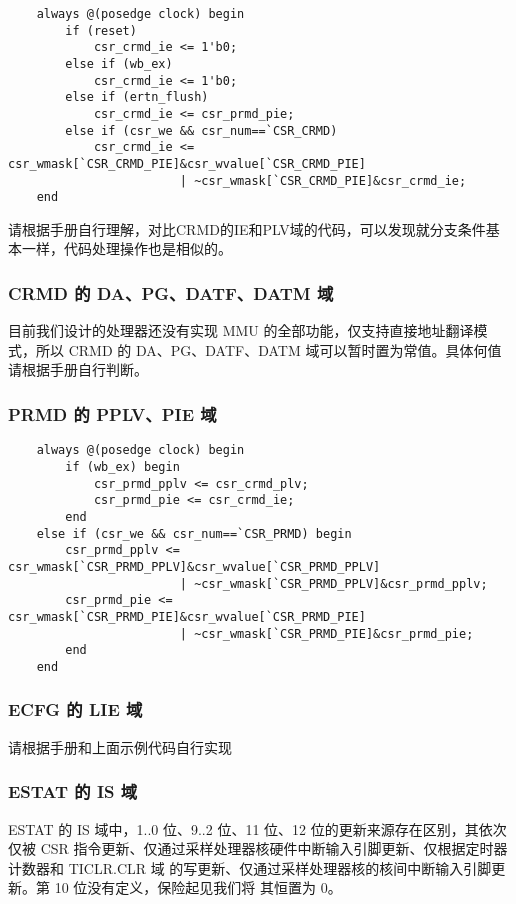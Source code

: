 \begin{lstlisting}
    always @(posedge clock) begin
        if (reset)
            csr_crmd_ie <= 1'b0;
        else if (wb_ex)
            csr_crmd_ie <= 1'b0;
        else if (ertn_flush)
            csr_crmd_ie <= csr_prmd_pie;
        else if (csr_we && csr_num==`CSR_CRMD)
            csr_crmd_ie <= csr_wmask[`CSR_CRMD_PIE]&csr_wvalue[`CSR_CRMD_PIE]
                        | ~csr_wmask[`CSR_CRMD_PIE]&csr_crmd_ie;
    end
\end{lstlisting}

请根据手册自行理解，对比CRMD的IE和PLV域的代码，可以发现就分支条件基本一样，代码处理操作也是相似的。

\subsubsection{CRMD 的 DA、PG、DATF、DATM 域}

目前我们设计的处理器还没有实现 MMU 的全部功能，仅支持直接地址翻译模式，所以
CRMD 的 DA、PG、DATF、DATM 域可以暂时置为常值。具体何值请根据手册自行判断。

\subsubsection{PRMD 的 PPLV、PIE 域}

\begin{lstlisting}
    always @(posedge clock) begin
        if (wb_ex) begin
            csr_prmd_pplv <= csr_crmd_plv;
            csr_prmd_pie <= csr_crmd_ie;
        end
    else if (csr_we && csr_num==`CSR_PRMD) begin
        csr_prmd_pplv <= csr_wmask[`CSR_PRMD_PPLV]&csr_wvalue[`CSR_PRMD_PPLV]
                        | ~csr_wmask[`CSR_PRMD_PPLV]&csr_prmd_pplv;
        csr_prmd_pie <= csr_wmask[`CSR_PRMD_PIE]&csr_wvalue[`CSR_PRMD_PIE]
                        | ~csr_wmask[`CSR_PRMD_PIE]&csr_prmd_pie;
        end
    end
\end{lstlisting}

\subsubsection{ECFG 的 LIE 域}

请根据手册和上面示例代码自行实现

\subsubsection{ESTAT 的 IS 域}

ESTAT 的 IS 域中，1..0 位、9..2 位、11 位、12 位的更新来源存在区别，其依次仅被 CSR
指令更新、仅通过采样处理器核硬件中断输入引脚更新、仅根据定时器计数器和 TICLR.CLR 域
的写更新、仅通过采样处理器核的核间中断输入引脚更新。第 10 位没有定义，保险起见我们将
其恒置为 0。

